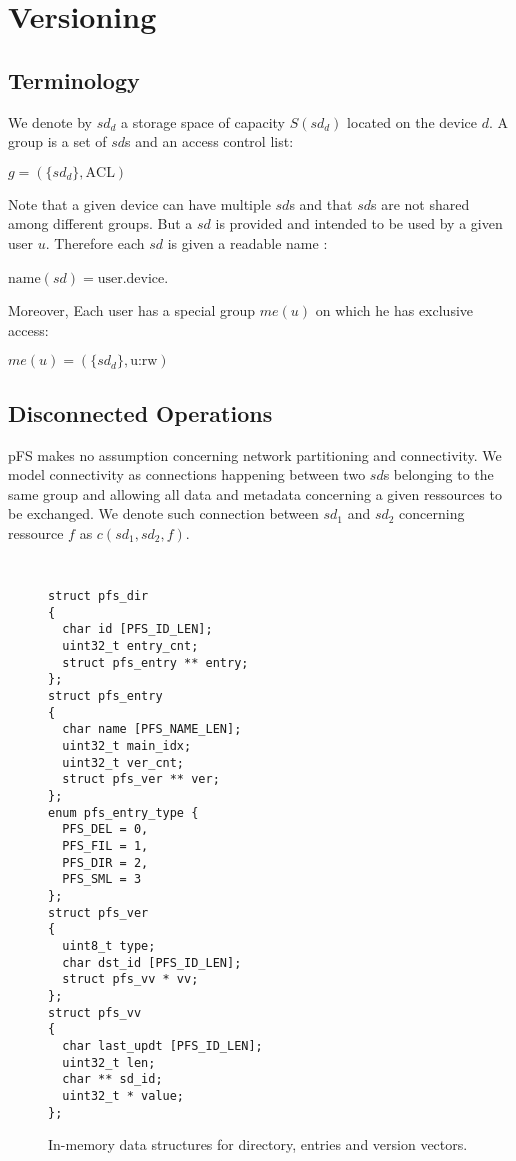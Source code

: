 
\section{Versioning}
\label{sec:vers}

\begin{figure*}
\centerline{}
\caption{PFS data structures}
\label{fig:struct}
\end{figure*}

\subsection{Terminology}

We denote by $sd_{d}$ a storage space of capacity $S(sd_{d})$
located on the device $d$. A group is a set of $sd$s and an
access control list:
\begin{center}
$g = (\{sd_{d}\}, \text{ACL})$
\end{center}
Note that a given device can have multiple $sd$s and that $sd$s are
not shared among different groups. But a $sd$ is provided and intended
to be used by a given user $u$. Therefore each $sd$ is given a
readable name :
\begin{center}
$\text{name}(sd) = \text{user}.\text{device}$. 
\end{center}
Moreover, Each user has a special group $me(u)$ on which he has
exclusive access:
\begin{center}
$me(u) = (\{sd_{d}\}, \text{u:rw})$
\end{center}

\subsection{Disconnected Operations}

pFS makes no assumption concerning network partitioning and
connectivity. We model connectivity as connections happening between
two $sd$s belonging to the same group and allowing all data and
metadata concerning a given ressources to be exchanged. We denote such
connection between $sd_{1}$ and $sd_{2}$ concerning ressource $f$ as
$c(sd_{1}, sd_{2}, f)$.

\begin{figure}[t]
\begin{center}
{\tt \small
\begin{verbatim}
struct pfs_dir
{
  char id [PFS_ID_LEN];
  uint32_t entry_cnt;
  struct pfs_entry ** entry;
};
struct pfs_entry
{
  char name [PFS_NAME_LEN];
  uint32_t main_idx;
  uint32_t ver_cnt; 
  struct pfs_ver ** ver;
};
enum pfs_entry_type {
  PFS_DEL = 0,
  PFS_FIL = 1,
  PFS_DIR = 2,
  PFS_SML = 3 
};
struct pfs_ver
{
  uint8_t type;
  char dst_id [PFS_ID_LEN];
  struct pfs_vv * vv;
};
struct pfs_vv
{ 
  char last_updt [PFS_ID_LEN];
  uint32_t len;
  char ** sd_id;
  uint32_t * value;
};
\end{verbatim}
}
\end{center}
\caption{\label{MemStruct}
{\small In-memory data structures for directory, entries and version
  vectors.}}
\end{figure}

